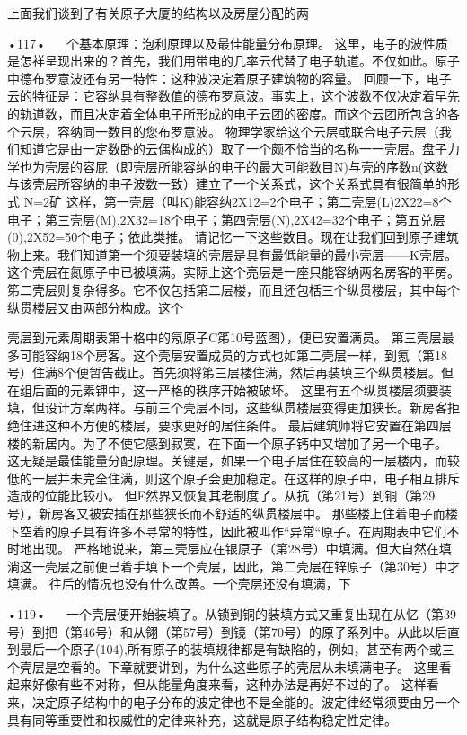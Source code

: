 上面我们谈到了有关原子大厦的结构以及房屋分配的两

•117•
  
个基本原理：泡利原理以及最佳能量分布原理。
这里，电子的波性质是怎祥呈现出来的？首先，我们用带电的几率云代替了电子轨道。不仅如此。原子中德布罗意波还有另一特性：这种波决定着原子建筑物的容量。
回顾一下，电子云的特征是：它容纳具有整数值的德布罗意波。事实上，这个波数不仅决定着早先的轨道数，而且决定着全体电子所形成的电子云团的密度。而这个云团所包含的各个云层，容纳同一数目的您布罗意波。
物理学家给这个云层或联合电子云层（我们知道它是由一定数卧的云偶构成的）取了一个颇不恰当的名称一一壳层。盘子力学也为壳层的容屁（即壳层所能容纳的电子的最大可能数目N)与壳的序数n(这数与该壳层所容纳的电子波数一致）建立了一个关系式，这个关系式具有很简单的形式
N=2矿
这样，第一壳层（叫K)能容纳2X12=2个电子；第二壳层(L)2X22=8个电子；第三壳层(M),2X32=18个电子；第四壳层(N),2X42=32个电子；第五兑层(0),2X52=50个电子；依此类推。
请记忆一下这些数目。现在让我们回到原子建筑物上来。我们知道第一个须要装填的壳层是具有最低能量的最小壳层——K壳层。这个壳层在氮原子中已被填满。实际上这个亮层是一座只能容纳两名房客的平房。
笫二壳层则复杂得多。它不仅包括第二层楼，而且还包栝三个纵贯楼层，其中每个纵贯楼层又由两部分构成。这个

壳层到元素周期表第十格中的氖原子C笫10号蓝图），便已安置满员。
第三壳层最多可能容纳18个房客。这个壳层安置成员的方式也如第二壳层一样，到氪（第18号）住满8个便暂告截止。首先须将笫三层楼住满，然后再装填三个纵贯楼层。但在组后面的元素钾中，这一严格的秩序开始被破坏。
这里有五个纵贯楼层须要装填，但设计方案两祥。与前三个壳层不同，这些纵贯楼层变得更加狭长。新房客拒绝住进这种不方便的楼层，要求更好的居住条件。
最后建筑师将它安置在第四层楼的新居内。为了不使它感到寂寞，在下面一个原子钙中又增加了另一个电子。
这无疑是最佳能量分配原理。关键是，如果一个电子居住在较高的一层楼内，而较低的一层并未完全住满，则这个原子会更加稳定。在这样的原子中，电子相互排斥造成的位能比较小。
但E然界又恢复其老制度了。从抗（笫21号）到铜（第29号），新房客又被安插在那些狭长而不舒适的纵贯楼层中。
那些楼上住着电子而楼下空着的原子具有许多不寻常的特性，因此被叫作“异常“原子。在周期表中它们不时地出现。
严格地说来，第三壳层应在银原子（第28号）中填满。但大自然在填淌这一壳层之前便已着手填下一个壳层，因此，第二壳层在锌原子（第30号）中才填满。
往后的情况也没有什么改善。一个壳层还没有填满，下

•119•
  
一个壳层便开始装填了。从锁到铜的装填方式又重复出现在从忆（第39号）到把（第46号）和从翎（第57号）到镜（第70号）的原子系列中。从此以后直到最后一个原子(104),所有原子的装填规律都是有缺陷的，例如，甚至有两个或三个壳层是空看的。下章就要讲到，为什么这些原子的壳层从未填满电子。
这里看起来好像有些不对称，但从能量角度来看，这种办法是再好不过的了。
这样看来，决定原子结构中的电子分布的波定律也不是全能的。波定律经常须要由另一个具有同等重要性和权威性的定律来补充，这就是原子结构稳定性定律。


